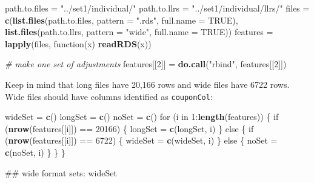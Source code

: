 \documentclass[10pt]{report}
\newenvironment{Shaded}{}{}
\newcommand{\KeywordTok}[1]{\textcolor[rgb]{0.00,0.44,0.13}{\textbf{{#1}}}}
\newcommand{\DataTypeTok}[1]{\textcolor[rgb]{0.56,0.13,0.00}{{#1}}}
\newcommand{\DecValTok}[1]{\textcolor[rgb]{0.25,0.63,0.44}{{#1}}}
\newcommand{\StringTok}[1]{\textcolor[rgb]{0.25,0.44,0.63}{{#1}}}
\newcommand{\CommentTok}[1]{\textcolor[rgb]{0.38,0.63,0.69}{\textit{{#1}}}}
\newcommand{\OtherTok}[1]{\textcolor[rgb]{0.00,0.44,0.13}{{#1}}}
\newcommand{\NormalTok}[1]{{#1}}
\begin{document}
\begin{Shaded}
\begin{Highlighting}[]
\NormalTok{path.to.files =}\StringTok{ "../set1/individual/"}
\NormalTok{path.to.llrs =}\StringTok{ "../set1/individual/llrs/"}
\NormalTok{files =}\StringTok{ }\KeywordTok{c}\NormalTok{(}\KeywordTok{list.files}\NormalTok{(path.to.files, }\DataTypeTok{pattern =} \StringTok{".rds"}\NormalTok{, }\DataTypeTok{full.name =} \OtherTok{TRUE}\NormalTok{), }\KeywordTok{list.files}\NormalTok{(path.to.llrs, }
    \DataTypeTok{pattern =} \StringTok{"wide"}\NormalTok{, }\DataTypeTok{full.name =} \OtherTok{TRUE}\NormalTok{))}
\NormalTok{features =}\StringTok{ }\KeywordTok{lapply}\NormalTok{(files, function(x) }\KeywordTok{readRDS}\NormalTok{(x))}

\CommentTok{# make one set of adjustments}
\NormalTok{features[[}\DecValTok{2}\NormalTok{]] =}\StringTok{ }\KeywordTok{do.call}\NormalTok{(}\StringTok{"rbind"}\NormalTok{, features[[}\DecValTok{2}\NormalTok{]])}
\end{Highlighting}
\end{Shaded}

Keep in mind that long files have 20,166 rows and wide files have 6722
rows. Wide files should have columns identified as \verb!couponCol!:

\begin{Shaded}
\begin{Highlighting}[]
\NormalTok{wideSet =}\StringTok{ }\KeywordTok{c}\NormalTok{()}
\NormalTok{longSet =}\StringTok{ }\KeywordTok{c}\NormalTok{()}
\NormalTok{noSet =}\StringTok{ }\KeywordTok{c}\NormalTok{()}
\NormalTok{for (i in }\DecValTok{1}\NormalTok{:}\KeywordTok{length}\NormalTok{(features)) \{}
    \NormalTok{if (}\KeywordTok{nrow}\NormalTok{(features[[i]]) ==}\StringTok{ }\DecValTok{20166}\NormalTok{) \{}
        \NormalTok{longSet =}\StringTok{ }\KeywordTok{c}\NormalTok{(longSet, i)}
    \NormalTok{\} else \{}
        \NormalTok{if (}\KeywordTok{nrow}\NormalTok{(features[[i]]) ==}\StringTok{ }\DecValTok{6722}\NormalTok{) \{}
            \NormalTok{wideSet =}\StringTok{ }\KeywordTok{c}\NormalTok{(wideSet, i)}
        \NormalTok{\} else \{}
            \NormalTok{noSet =}\StringTok{ }\KeywordTok{c}\NormalTok{(noSet, i)}
        \NormalTok{\}}
    \NormalTok{\}}
\NormalTok{\}}

\NormalTok{## wide format sets:}
\NormalTok{wideSet}
\end{Highlighting}
\end{Shaded}
\end{document}
